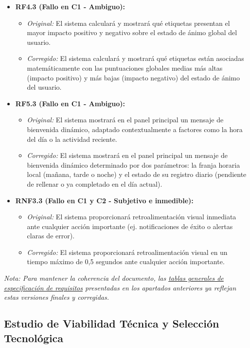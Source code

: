 \begin{itemize}
    \item \textbf{RF4.3 (Fallo en C1 - Ambiguo):}
    \begin{itemize}
        \item \textit{Original:} El sistema calculará y mostrará qué etiquetas presentan el mayor impacto positivo y negativo sobre el estado de ánimo global del usuario.
        \item \textit{Corregido:} El sistema calculará y mostrará qué etiquetas están asociadas matemáticamente con las puntuaciones globales medias más altas (impacto positivo) y más bajas (impacto negativo) del estado de ánimo del usuario.
    \end{itemize}

    \item \textbf{RF5.3 (Fallo en C1 - Ambiguo):}
    \begin{itemize}
        \item \textit{Original:} El sistema mostrará en el panel principal un mensaje de bienvenida dinámico, adaptado contextualmente a factores como la hora del día o la actividad reciente.
        \item \textit{Corregido:} El sistema mostrará en el panel principal un mensaje de bienvenida dinámico determinado por dos parámetros: la franja horaria local (mañana, tarde o noche) y el estado de su registro diario (pendiente de rellenar o ya completado en el día actual).
    \end{itemize}

    \item \textbf{RNF3.3 (Fallo en C1 y C2 - Subjetivo e inmedible):}
    \begin{itemize}
        \item \textit{Original:} El sistema proporcionará retroalimentación visual inmediata ante cualquier acción importante (ej. notificaciones de éxito o alertas claras de error).
        \item \textit{Corregido:} El sistema proporcionará retroalimentación visual en un tiempo máximo de 0,5 segundos ante cualquier acción importante.
    \end{itemize}
\end{itemize}

\textit{Nota: Para mantener la coherencia del documento, las \hyperref[tab:rf_total]{tablas generales de especificación de requisitos} presentadas en los apartados anteriores ya reflejan estas versiones finales y corregidas.}




\subsection{Estudio de Viabilidad Técnica y Selección Tecnológica}

